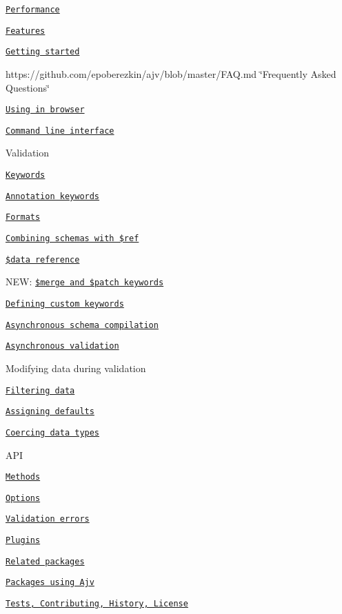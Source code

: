 \begin{DoxyItemize}
\item \href{#performance}{\tt Performance}
\item \href{#features}{\tt Features}
\item \href{#getting-started}{\tt Getting started}
\item https\+://github.com/epoberezkin/ajv/blob/master/\+F\+A\+Q.\+md \char`\"{}\+Frequently Asked Questions\char`\"{}
\item \href{#using-in-browser}{\tt Using in browser}
\item \href{#command-line-interface}{\tt Command line interface}
\item Validation
\begin{DoxyItemize}
\item \href{#validation-keywords}{\tt Keywords}
\item \href{#annotation-keywords}{\tt Annotation keywords}
\item \href{#formats}{\tt Formats}
\item \href{#ref}{\tt Combining schemas with \$ref}
\item \href{#data-reference}{\tt \$data reference}
\item N\+EW\+: \href{#merge-and-patch-keywords}{\tt \$merge and \$patch keywords}
\item \href{#defining-custom-keywords}{\tt Defining custom keywords}
\item \href{#asynchronous-schema-compilation}{\tt Asynchronous schema compilation}
\item \href{#asynchronous-validation}{\tt Asynchronous validation}
\end{DoxyItemize}
\item Modifying data during validation
\begin{DoxyItemize}
\item \href{#filtering-data}{\tt Filtering data}
\item \href{#assigning-defaults}{\tt Assigning defaults}
\item \href{#coercing-data-types}{\tt Coercing data types}
\end{DoxyItemize}
\item A\+PI
\begin{DoxyItemize}
\item \href{#api}{\tt Methods}
\item \href{#options}{\tt Options}
\item \href{#validation-errors}{\tt Validation errors}
\end{DoxyItemize}
\item \href{#plugins}{\tt Plugins}
\item \href{#related-packages}{\tt Related packages}
\item \href{#some-packages-using-ajv}{\tt Packages using Ajv}
\item \href{#tests}{\tt Tests, Contributing, History, License}
\end{DoxyItemize}

